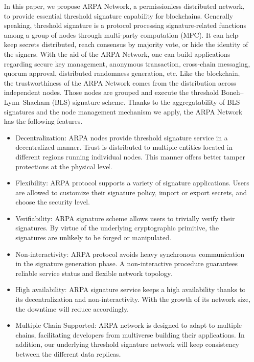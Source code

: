\documentclass[11pt]{article}
\begin{document}
In this paper, we propose ARPA Network, a permissionless distributed network, to provide essential threshold signature capability for blockchains. Generally speaking, threshold signature is a protocol processing signature-related functions among a group of nodes through multi-party computation (MPC). It can help keep secrets distributed, reach consensus by majority vote, or hide the identity of the signers. With the aid of the ARPA Network, one can build applications regarding secure key management, anonymous transaction, cross-chain messaging, quorum approval, distributed randomness generation, etc. Like the blockchain, the trustworthiness of the ARPA Network comes from the distribution across independent nodes. Those nodes are grouped and execute the threshold Boneh–Lynn–Shacham (BLS) signature scheme. Thanks to the aggregatability of BLS signatures and the node management mechanism we apply, the ARPA Network has the following features.
\begin{itemize}
    \item Decentralization: ARPA nodes provide threshold signature service in a decentralized manner. Trust is distributed to multiple entities located in different regions running individual nodes. This manner offers better tamper protections at the physical level.
    \item Flexibility: ARPA protocol supports a variety of signature applications. Users are allowed to customize their signature policy, import or export secrets, and choose the security level.
    \item Verifiability: ARPA signature scheme allows users to trivially verify their signatures. By virtue of the underlying cryptographic primitive, the signatures are unlikely to be forged or manipulated.
    \item Non-interactivity: ARPA protocol avoids heavy synchronous communication in the signature generation phase. A non-interactive procedure guarantees reliable service status and flexible network topology.
    \item High availability: ARPA signature service keeps a high availability thanks to its decentralization and non-interactivity. With the growth of its network size, the downtime will reduce accordingly.
    \item Multiple Chain Supported: ARPA network is designed to adapt to multiple chains, facilitating developers from multiverse building their applications. In addition, our underlying threshold signature network will keep consistency between the different data replicas.
\end{itemize}
\end{document}
